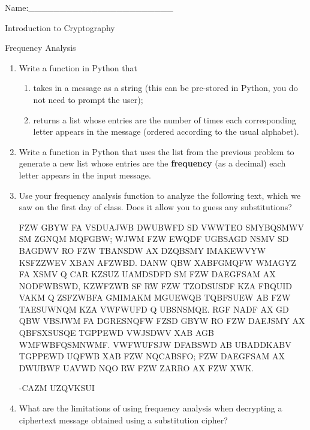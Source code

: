 \documentclass[12pt]{amsart}
\theoremstyle{definition}
\theoremstyle{remark}
\numberwithin{equation}{section}
\begin{document}
\begin{flushright}
Name:\_\_\_\_\_\_\_\_\_\_\_\_\_\_\_\_\_\_\_\_\_\_\_
\end{flushright}
\vspace{10pt}
\begin{center}
Introduction to Cryptography

Frequency Analysis
\end{center}


\begin{enumerate}
\item Write a function in Python that
\begin{enumerate}
\item takes in a message as a string (this can be pre-stored in Python, you do not need to prompt the user);
\item returns a list whose entries are the number of times each corresponding letter appears in the message (ordered according to the usual alphabet).
\end{enumerate}
\item Write a function in Python that uses the list from the previous problem to generate a new list whose entries are the {\bf frequency} (as a decimal) each letter appears in the input message.
\item Use your frequency analysis function to analyze the following text, which we saw on the first day of class. Does it allow you to guess any substitutions?

FZW GBYW FA VSDUAJWB DWUBWFD SD VWWTEO SMYBQSMWV SM ZGNQM MQFGBW; WJWM FZW EWQDF UGBSAGD NSMV SD BAGDWV RO FZW TBANSDW AX DZQBSMY IMAKEWVYW KSFZZWEV XBAN AFZWBD. DANW QBW XABFGMQFW WMAGYZ FA XSMV Q CAR KZSUZ UAMDSDFD SM FZW DAEGFSAM AX NODFWBSWD, KZWFZWB SF RW FZW TZODSUSDF KZA FBQUID VAKM Q ZSFZWBFA GMIMAKM MGUEWQB TQBFSUEW AB FZW TAESUWNQM KZA VWFWUFD Q UBSNSMQE. RGF NADF AX GD QBW VBSJWM FA DGRESNQFW FZSD GBYW RO FZW DAEJSMY AX QBFSXSUSQE TGPPEWD VWJSDWV XAB AGB WMFWBFQSMNWMF. VWFWUFSJW DFABSWD AB UBADDKABV TGPPEWD UQFWB XAB FZW NQCABSFO; FZW DAEGFSAM AX DWUBWF UAVWD NQO RW FZW ZARRO AX FZW XWK.

-CAZM UZQVKSUI

\item What are the limitations of using frequency analysis when decrypting a ciphertext message obtained using a substitution cipher?
\end{enumerate}
\vfill
\end{document}
